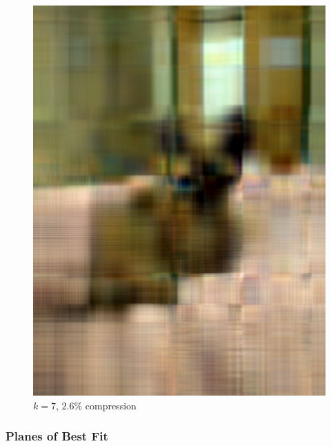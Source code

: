 \documentclass[12pt, letterpaper]{article}
\theoremstyle{definition}
\theoremstyle{remark}
\begin{document}
\begin{figure}[H]
\begin{minipage}[b]{0.4\textwidth}
    \includegraphics[width=\textwidth]{images/compressed_cat_7.png}
    \caption{$k = 7$, $2.6\%$ compression}
  \end{minipage}
\end{figure}

\subsubsection{Planes of Best Fit}




\printbibliography
\end{document}
